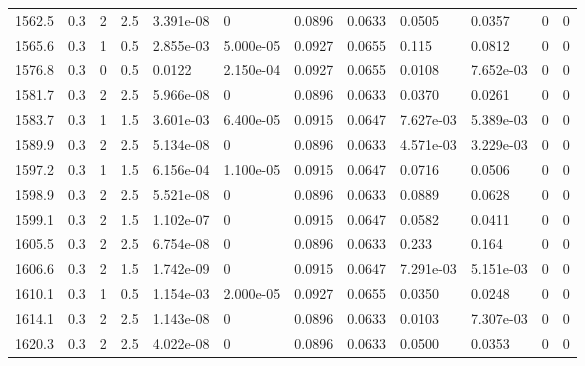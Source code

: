 \documentclass[preview]{standalone}
\begin{document}
{{{{{{{{{\begin{tabular}{L{1.2cm}C{1.2cm} C{0.3cm}C{0.5cm} C{1.4cm}C{1.4cm} C{1.4cm}C{1.4cm} C{1.6cm}C{1.6cm} C{1.6cm}C{1.6cm}}
  1562.5  &   0.3  & 2     & 2.5 &  3.391e-08  & 0  &  0.0896&   0.0633& 0.0505 & 0.0357   &  0 & 0  \\ 
  1565.6  &   0.3  & 1     & 0.5 &  2.855e-03  & 5.000e-05  &  0.0927&   0.0655& 0.115 & 0.0812   &  0 & 0  \\ 
  1576.8  &   0.3  & 0     & 0.5 &  0.0122  & 2.150e-04  &  0.0927&   0.0655& 0.0108 & 7.652e-03   &  0 & 0  \\ 
  1581.7  &   0.3  & 2     & 2.5 &  5.966e-08  & 0  &  0.0896&   0.0633& 0.0370 & 0.0261   &  0 & 0  \\ 
  1583.7  &   0.3  & 1     & 1.5 &  3.601e-03  & 6.400e-05  &  0.0915&   0.0647& 7.627e-03 & 5.389e-03   &  0 & 0  \\ 
  1589.9  &   0.3  & 2     & 2.5 &  5.134e-08  & 0  &  0.0896&   0.0633& 4.571e-03 & 3.229e-03   &  0 & 0  \\ 
  1597.2  &   0.3  & 1     & 1.5 &  6.156e-04  & 1.100e-05  &  0.0915&   0.0647& 0.0716 & 0.0506   &  0 & 0  \\ 
  1598.9  &   0.3  & 2     & 2.5 &  5.521e-08  & 0  &  0.0896&   0.0633& 0.0889 & 0.0628   &  0 & 0  \\ 
  1599.1  &   0.3  & 2     & 1.5 &  1.102e-07  & 0  &  0.0915&   0.0647& 0.0582 & 0.0411   &  0 & 0  \\ 
  1605.5  &   0.3  & 2     & 2.5 &  6.754e-08  & 0  &  0.0896&   0.0633& 0.233 & 0.164   &  0 & 0  \\ 
  1606.6  &   0.3  & 2     & 1.5 &  1.742e-09  & 0  &  0.0915&   0.0647& 7.291e-03 & 5.151e-03   &  0 & 0  \\ 
  1610.1  &   0.3  & 1     & 0.5 &  1.154e-03  & 2.000e-05  &  0.0927&   0.0655& 0.0350 & 0.0248   &  0 & 0  \\ 
  1614.1  &   0.3  & 2     & 2.5 &  1.143e-08  & 0  &  0.0896&   0.0633& 0.0103 & 7.307e-03   &  0 & 0  \\ 
  1620.3  &   0.3  & 2     & 2.5 &  4.022e-08  & 0  &  0.0896&   0.0633& 0.0500 & 0.0353   &  0 & 0  \\ 
\hline 
\end{tabular} 

}}}}}}}}}
\end{document}
